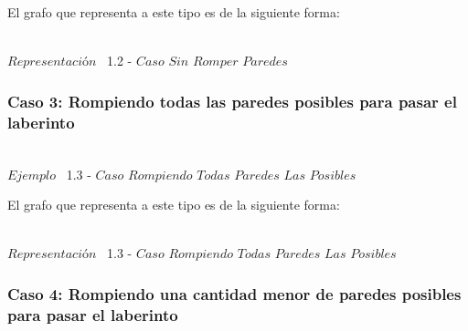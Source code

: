 El grafo que representa a este tipo es de la siguiente forma:\\

\vspace*{0.3cm} \vspace*{0.3cm}
  \begin{center}
 \\{$Representación$ \ 1.2 - $Caso$ $Sin$ $Romper$ $Paredes$}
  \end{center}
  \vspace*{0.3cm}

  
\begin{center}
 \subsubsection*{Caso 3: Rompiendo todas las paredes posibles para pasar el laberinto}
\end{center}
 
\vspace*{0.3cm} \vspace*{0.3cm}
  \begin{center}
\\ {$Ejemplo$ \ 1.3 - $Caso$ $Rompiendo$ $Todas$ $Paredes$ $Las$ $Posibles$}
  \end{center}
  \vspace*{0.3cm}

El grafo que representa a este tipo es de la siguiente forma:\\

\vspace*{0.3cm} \vspace*{0.3cm}
  \begin{center}
 \\{$Representación$ \ 1.3 - $Caso$ $Rompiendo$ $Todas$ $Paredes$ $Las$ $Posibles$}
  \end{center}
  \vspace*{0.3cm}


\begin{center}
  \subsubsection*{Caso 4: Rompiendo una cantidad menor de paredes posibles para pasar el laberinto}
\end{center}


